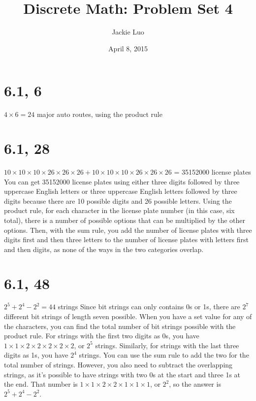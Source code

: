 \documentclass{article}
\title{Discrete Math: Problem Set 4}
\author{Jackie Luo}
\date{April 8, 2015}
\begin{document}
\maketitle

\section{6.1, 6}
$4 \times 6 = 24$ major auto routes, using the product rule

\section{6.1, 28}
$10 \times 10 \times 10 \times 26 \times 26 \times 26 + 10 \times 10 \times 10 \times 26 \times 26 \times 26$ = 35152000 license plates
\newline
You can get 35152000 license plates using either three digits followed by three uppercase English letters or three uppercase English letters followed by three digits because there are 10 possible digits and 26 possible letters. Using the product rule, for each character in the license plate number (in this case, six total), there is a number of possible options that can be multiplied by the other options. Then, with the sum rule, you add the number of license plates with three digits first and then three letters to the number of license plates with letters first and then digits, as none of the ways in the two categories overlap.

\section{6.1, 48}
$2^5 + 2^4 - 2^2 = 44$ strings
\newline
Since bit strings can only contains 0s or 1s, there are $2^7$ different bit strings of length seven possible. When you have a set value for any of the characters, you can find the total number of bit strings possible with the product rule. For strings with the first two digits as 0s, you have $1 \times 1 \times 2 \times 2 \times 2 \times 2 \times 2$, or $2^5$ strings. Similarly, for strings with the last three digits as 1s, you have $2^4$ strings. You can use the sum rule to add the two for the total number of strings. However, you also need to subtract the overlapping strings, as it's possible to have strings with two 0s at the start and three 1s at the end. That number is $1 \times 1 \times 2 \times 2 \times 1 \times 1 \times 1$, or $2^2$, so the answer is $2^5 + 2^4 - 2^2$.
\end{document}
